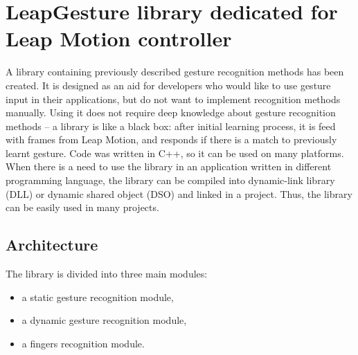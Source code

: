 \chapter{LeapGesture library dedicated for Leap Motion controller}\label{libraryChapter}


A library containing previously described gesture recognition methods has been created.
It is designed as an aid for developers who would like to use gesture input in their applications, but do not want to implement recognition methods manually.
Using it does not require deep knowledge about gesture recognition methods -- a library is like a black box: after initial learning process, it is feed with frames from Leap Motion, and responds if there is a match to previously learnt gesture.
Code was written in C++, so it can be used on many platforms.
When there is a need to use the library in an application written in different programming language, the library can be compiled into dynamic-link library (DLL) or dynamic shared object (DSO) and linked in a project.
Thus, the library can be easily used in many projects.


\section{Architecture} \label{architectureSection}

The library is divided into three main modules:
\begin{itemize}
\item a static gesture recognition module,
\item a dynamic gesture recognition module,
\item a fingers recognition module.
\end{itemize}

